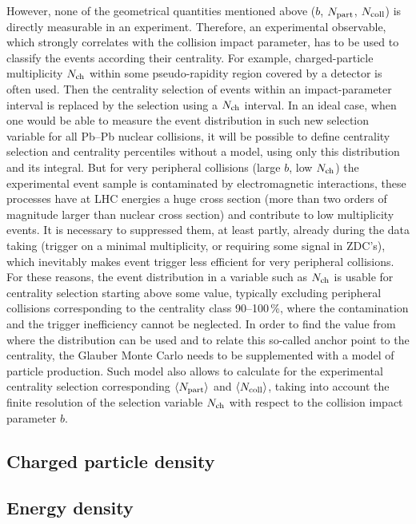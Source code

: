However, none of the geometrical quantities mentioned above ($b$, $N_{\rm part}$, $N_{\rm coll}$) is directly measurable in an experiment. Therefore, an experimental observable, which strongly correlates with the collision impact parameter, has to be used to classify the events according their centrality. For example, charged-particle multiplicity $N_{\rm ch}$ within some pseudo-rapidity region covered by a detector is often used. Then the centrality selection of events within an impact-parameter interval is replaced by the selection using a $N_{\rm ch}$ interval. In an ideal case, when one would be able to measure the event distribution in such new selection variable for all Pb--Pb nuclear collisions, it will be possible to define centrality selection and centrality percentiles without a model, using only this distribution and its integral. But for very peripheral collisions (large $b$, low $N_{\rm ch}$) the experimental event sample is contaminated by electromagnetic interactions, these processes have at LHC energies a huge cross section (more than two orders of magnitude larger than nuclear cross section) and contribute to low multiplicity events. It is necessary to suppressed them, at least partly, already during the data taking (trigger on a minimal multiplicity, or requiring some signal in ZDC's), which inevitably makes event trigger less efficient for very peripheral collisions. For these reasons, the event distribution in a variable such as $N_{\rm ch}$ is usable for centrality selection starting above some value, typically excluding peripheral collisions corresponding to the centrality class 90--100\,\%, where the contamination and the trigger inefficiency cannot be neglected. In order to find the value from where the distribution can be used and to relate this so-called anchor point to the centrality, the Glauber Monte Carlo needs to be supplemented with a model of particle production. Such model also allows to calculate for the experimental centrality selection corresponding $\langle N_{\rm part} \rangle$ and $\langle N_{\rm coll} \rangle$, taking into account the finite resolution of the selection variable $N_{\rm ch}$ with respect to the collision impact parameter $b$.



\subsection{Charged particle density}
\label{subsecks:partdensity}
\subsection{Energy density}
\label{subsecks:energydensity}
